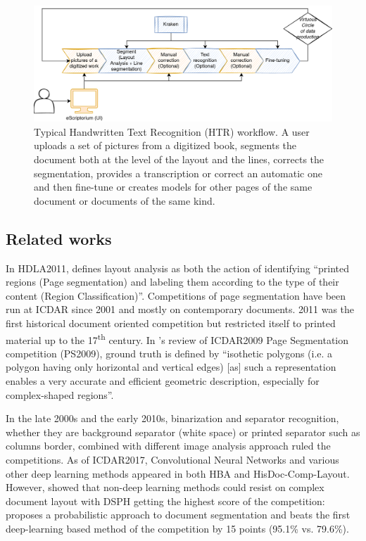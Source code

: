 \documentclass{jdmdh}
\begin{document}
\begin{figure}[h]
    \centering
    \includegraphics[width=\linewidth]{images/kraken-escriptorium.png}
    \caption{Typical Handwritten Text Recognition (HTR) workflow. A user uploads a set of pictures from a digitized book, segments the document both at the level of the layout and the lines, corrects the segmentation, provides a transcription or correct an automatic one and then fine-tune or creates models for other pages of the same document or documents of the same kind.}
    \label{fig:htr-workflow}
\end{figure}

\subsection{Related works}

In HDLA2011, \citet{antonacopoulos2011historical} defines layout analysis as both the action of identifying ``printed regions (Page segmentation) and labeling them according to the type of their content (Region Classification)''. Competitions of page segmentation have been run at ICDAR since 2001 and mostly on contemporary documents. 2011 was the first historical document oriented competition but restricted itself to printed material up to the 17\textsuperscript{th} century. In \citet{antonacopoulos2009icdar}'s review of ICDAR2009 Page Segmentation competition (PS2009), ground truth is defined by ``isothetic polygons (i.e. a polygon having only horizontal and vertical edges) [as] such a representation enables a very accurate and efficient geometric description, especially for complex-shaped regions''. 

In the late 2000s and the early 2010s, binarization and separator recognition, whether they are background separator (white space) or printed separator such as columns border, combined with different image analysis approach ruled the competitions. As of ICDAR2017, Convolutional Neural Networks and various other deep learning methods appeared in both HBA and HisDoc-Comp-Layout. However, \citet{antonacopoulos2009icdar} showed that non-deep learning methods could resist on complex document layout with DSPH getting the highest score of the competition: \citet{lu2021probabilistic} proposes a probabilistic approach to document segmentation and beats the first deep-learning based method of the competition by 15 points (95.1\% vs. 79.6\%).
\end{document}
